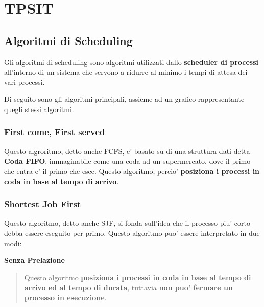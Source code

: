 \documentclass{article}
\begin{document}
{\begin{quote}

    \end{quote}
  }

  \pagebreak
  \section{TPSIT}
  {
    \subsection{Algoritmi di Scheduling}
    Gli algoritmi di scheduling sono algoritmi utilizzati dallo \textbf{scheduler di processi} all'interno di un sistema che servono a ridurre al minimo i tempi di attesa dei vari processi.

    Di seguito sono gli algoritmi principali, assieme ad un grafico rappresentante quegli stessi algoritmi.

    \subsubsection{First come, First served} %
    Questo algroritmo, detto anche FCFS, e' basato su di una struttura dati detta \textbf{Coda FIFO}, immaginabile come una coda ad un supermercato, dove il primo che entra e' il primo che esce. Questo algoritmo, percio' \textbf{posiziona i processi in coda in base al tempo di arrivo}.

    \subsubsection{Shortest Job First} %
    Questo algoritmo, detto anche SJF, si fonda sull'idea che il processo piu' corto debba essere eseguito per primo. Questo algoritmo puo' essere interpretato in due modi:

    \textbf{Senza Prelazione}
    \begin{quote}
      Questo algoritmo \textbf{posiziona i processi in coda in base al tempo di arrivo ed al tempo di durata}, tuttavia \textbf{non puo' fermare un processo in esecuzione}.
    \end{quote}

}
\end{document}
